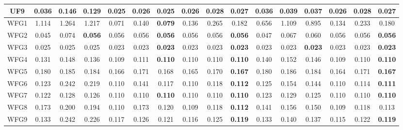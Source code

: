 \begin{table}[]
{\begin{tabular}{c|c|c|c|c|c|c|c|c|c|c|c|c|c|c|c|}
\multicolumn{1}{|c|}{UF9} & 0.036 & 0.146 & 0.129 & 0.025 & 0.026 & \textbf{0.025} & 0.026 & 0.028 & 0.027 & 0.036 & 0.039 & 0.037 & 0.026 & 0.028 & 0.027 \\ \hline
\multicolumn{1}{|c|}{WFG1} & 1.114 & 1.264 & 1.217 & 0.071 & 0.140 & \textbf{0.079} & 0.136 & 0.265 & 0.182 & 0.656 & 1.109 & 0.895 & 0.134 & 0.233 & 0.180 \\ \hline
\multicolumn{1}{|c|}{WFG2} & 0.045 & 0.074 & \textbf{0.056} & 0.056 & 0.056 & \textbf{0.056} & 0.056 & 0.056 & \textbf{0.056} & 0.047 & 0.067 & 0.060 & 0.056 & 0.056 & \textbf{0.056} \\ \hline
\multicolumn{1}{|c|}{WFG3} & 0.025 & 0.025 & 0.025 & 0.023 & 0.023 & \textbf{0.023} & 0.023 & 0.023 & \textbf{0.023} & 0.023 & 0.023 & \textbf{0.023} & 0.023 & 0.023 & \textbf{0.023} \\ \hline
\multicolumn{1}{|c|}{WFG4} & 0.131 & 0.148 & 0.136 & 0.109 & 0.111 & \textbf{0.110} & 0.110 & 0.110 & \textbf{0.110} & 0.140 & 0.152 & 0.146 & 0.109 & 0.110 & \textbf{0.110} \\ \hline
\multicolumn{1}{|c|}{WFG5} & 0.180 & 0.185 & 0.184 & 0.166 & 0.171 & 0.168 & 0.165 & 0.170 & \textbf{0.167} & 0.180 & 0.186 & 0.184 & 0.164 & 0.171 & \textbf{0.167} \\ \hline
\multicolumn{1}{|c|}{WFG6} & 0.123 & 0.242 & 0.219 & 0.110 & 0.141 & 0.117 & 0.110 & 0.118 & \textbf{0.112} & 0.125 & 0.154 & 0.144 & 0.110 & 0.114 & \textbf{0.111} \\ \hline
\multicolumn{1}{|c|}{WFG7} & 0.122 & 0.128 & 0.126 & 0.110 & 0.110 & \textbf{0.110} & 0.110 & 0.110 & \textbf{0.110} & 0.123 & 0.129 & 0.125 & 0.110 & 0.110 & \textbf{0.110} \\ \hline
\multicolumn{1}{|c|}{WFG8} & 0.173 & 0.200 & 0.194 & 0.110 & 0.173 & 0.120 & 0.109 & 0.118 & \textbf{0.112} & 0.141 & 0.156 & 0.150 & 0.109 & 0.118 & 0.113 \\ \hline
\multicolumn{1}{|c|}{WFG9} & 0.133 & 0.242 & 0.226 & 0.117 & 0.126 & 0.121 & 0.116 & 0.125 & \textbf{0.119} & 0.133 & 0.140 & 0.137 & 0.115 & 0.122 & \textbf{0.119} \\ \hline
\end{tabular}%
}
\end{table}

